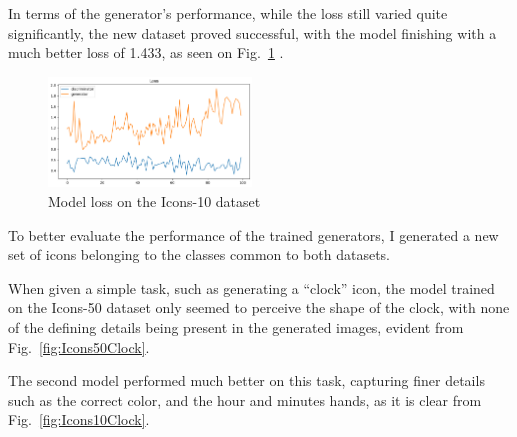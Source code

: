 In terms of the generator's performance, while the loss still varied quite significantly, the new dataset proved successful, with the model finishing with a much better loss of 1.433, as seen on Fig.~\ref{fig:Icons10Loss} .

\begin{figure}[htbp]
    \centering
    \includegraphics[width=0.48\textwidth]{images/icons10/icons10_loss}
    \caption{Model loss on the Icons-10 dataset}
    \label{fig:Icons10Loss}
\end{figure}

To better evaluate the performance of the trained generators, I generated a new set of icons belonging to the classes common to both datasets.

When given a simple task, such as generating a ``clock'' icon, the model trained on the Icons-50 dataset only seemed to perceive the shape of the clock, with none of the defining details being present in the generated images, evident from Fig.~\ref{fig:Icons50Clock}.

The second model performed much better on this task, capturing finer details such as the correct color, and the hour and minutes hands, as it is clear from Fig.~\ref{fig:Icons10Clock}.

